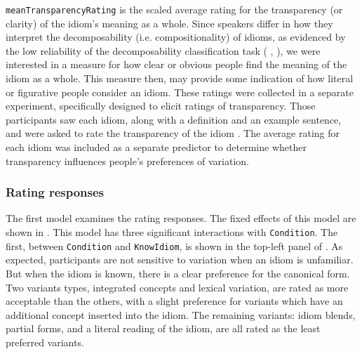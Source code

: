 \documentclass[output=paper,modfonts,nonflat]{langsci/langscibook}
\begin{document}
\texttt{meanTransparencyRating} is the scaled average rating for the transparency (or clarity) of the idiom's meaning as a whole. Since speakers differ in how they interpret the decomposability (i.e. compositionality) of idioms, as evidenced by the low reliability of the decomposability classification task (\citeauthor{TitoneConnine1994} \citeyear*{TitoneConnine1994}, \citeauthor*{TabossiEtAl2008} \citeyear*{TabossiEtAl2008}), we were interested in a measure for how clear or obvious people find the meaning of the idiom as a whole. This measure then, may provide some indication of how literal or figurative people consider an idiom. These ratings were collected in a separate experiment, specifically designed to elicit ratings of transparency. Those participants saw each idiom, along with a definition and an example sentence, and were asked to rate the transparency of the idiom \citep[for further details, see][]{Geeraert2016}. The average rating for each idiom was included as a separate predictor to determine whether transparency influences people's preferences of variation.

\subsubsection{Rating responses}

The first model examines the rating responses. The fixed effects of this model are shown in . This model has three significant interactions with \texttt{Condition}. The first, between \texttt{Condition} and \texttt{KnowIdiom}, is shown in the top-left panel of . As expected, participants are not sensitive to variation when an idiom is unfamiliar. But when the idiom is known, there is a clear preference for the canonical form. Two variants types, integrated concepts and lexical variation, are rated as more acceptable than the others, with a slight preference for variants which have an additional concept inserted into the idiom. The remaining variants: idiom blends, partial forms, and a literal reading of the idiom, are all rated as the least preferred variants.
\end{document}
